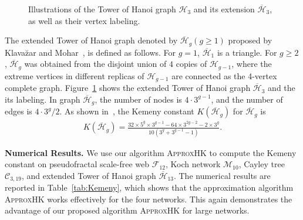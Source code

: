 \documentclass[10pt,twocolumn,twoside]{IEEEtran}
\begin{document}
\begin{figure}[!t]
{\begin{minipage}[t]{0.5\linewidth}
            \label{exSierpinski}
        \end{minipage}%
    }%
    \centering
    \caption{Illustrations of the Tower of Hanoi graph \(\mathcal{H}_{3}\) and its extension \(\overline{\mathcal{H}}_{3}\), as well as  their vertex labeling.}
\end{figure}

The extended  Tower of Hanoi graph denoted by \(\overline{\mathcal{H}}_{g}(g\ge 1)\)  proposed by Klava\u zar and Mohar~\cite{KlMo05,ZhWuLiCo16,QiDoZhZh20}, is defined as follows. For \(g=1\), \(\overline{\mathcal{H}}_{1}\) is a triangle. For \(g\ge2\),  \(\overline{\mathcal{H}}_{g}\) was obtained from the disjoint union of \(4\) copies of \(\mathcal{H}_{g-1}\), where the extreme vertices in different  replicas of \(\mathcal{H}_{g-1}\) are connected as the 4-vertex complete graph. Figure~\ref{exSierpinski} shows the extended  Tower of Hanoi graph \(\overline{\mathcal{H}}_{3}\) and the its labeling. In graph \(\overline{\mathcal{H}}_{g}\), the number of nodes is \(4\cdot3^{g-1}\), and the number of edges is \(4\cdot3^g/2\). As shown in~\cite{QiZh18}, the Kemeny constant \(K(\overline{\mathcal{H}}_{g})\) for \(\overline{\mathcal{H}}_{g}\) is
\begin{align}
    K(\overline{\mathcal{H}}_{g}) = \frac{32\times5^g\times3^{g-1}-64\times3^{2g-2}-2\times3^g}{10(3^g+3^{g-1}-1)}.
    \label{Kg04}
\end{align}

\textbf{Numerical Results.} We use our algorithm \textsc{ApproxHK} to compute the Kemeny constant on   pseudofractal scale-free web \(\mathcal{F}_{12}\),  Koch network \(\mathcal{M}_{10}\),   Cayley tree \(\mathcal{C}_{3,19}\), and   extended  Tower of Hanoi graph \(\overline{\mathcal{H}}_{13}\). The numerical results are reported in  Table~\ref{tab:Kemeny}, which shows that the approximation algorithm \textsc{ApproxHK} works effectively for the four networks. This again demonstrates the advantage of our proposed algorithm  \textsc{ApproxHK} for large networks.
\end{document}
